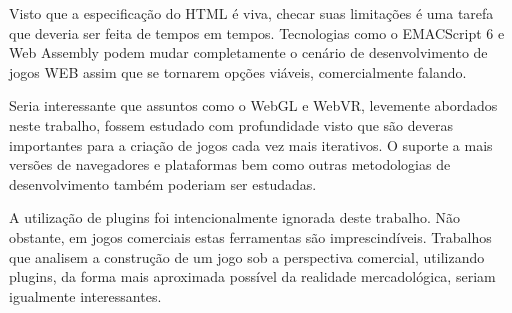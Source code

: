 Visto que a especificação do HTML é viva, checar suas limitações
é uma tarefa que deveria ser feita de tempos em tempos. Tecnologias
como o EMACScript 6 e Web Assembly podem mudar completamente o cenário
de desenvolvimento de jogos WEB assim que se tornarem opções viáveis,
comercialmente falando.

Seria interessante que assuntos como o WebGL e WebVR, levemente
abordados neste trabalho, fossem estudado com profundidade visto que
são deveras importantes para a criação de jogos cada vez mais
iterativos. O suporte a mais versões de navegadores e plataformas
bem como outras metodologias de desenvolvimento também poderiam ser
estudadas.

A utilização de plugins foi intencionalmente ignorada deste
trabalho. Não obstante, em jogos comerciais estas ferramentas são
imprescindíveis. Trabalhos que analisem a construção de um jogo sob
a perspectiva comercial, utilizando plugins, da forma mais aproximada
possível da realidade mercadológica, seriam igualmente interessantes.

